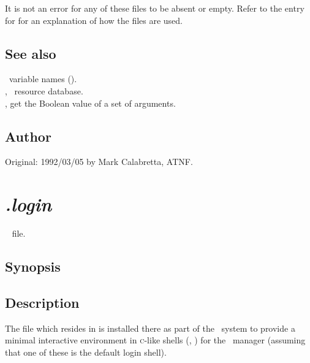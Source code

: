 \noindent
It is not an error for any of these files to be absent or empty.  Refer to
the entry for  for an explanation of how the 
files are used.

\subsection*{See also}

\aipspp\ variable names ().\\
, \aipspp\ resource database.\\
, get the Boolean value of a set of arguments.

\subsection*{Author}

Original: 1992/03/05 by Mark Calabretta, ATNF.


\newpage
\section{\textit{.login}}
\label{.login}




\aipspp\  file.

\subsection*{Synopsis}

\begin{synopsis}
\end{synopsis}

\subsection*{Description}

The  file which resides in  is installed there
as part of the \aipspp\ system to provide a minimal interactive environment
in \textsc{c}-like shells (, ) for the \aipspp\ 
manager (assuming that one of these is the default login shell).

